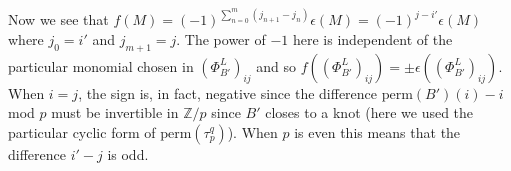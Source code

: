 \documentclass[11pt]{amsart}
\def\Z{{\mathbb Z}}
\begin{document}
  Now we see that $f(M) = (-1)^{\sum_{n=0}^m(j_{n+1}-j_n)}\epsilon(M) = (-1)^{j-i'}\epsilon(M)$ where $j_0=i'$ and $j_{m+1}=j$. The power of $-1$ here is independent of the particular monomial chosen in $\left(\Phi_{B'}^L\right)_{ij}$ and so $f((\Phi_{B'}^L)_{ij}) = \pm\epsilon((\Phi_{B'}^L)_{ij})$. When $i = j$, the sign is, in fact, negative since the difference $\text{perm}(B')(i)-i$ mod $p$ must be invertible in $\Z\big/p$ since $B'$ closes to a knot (here we used the particular cyclic form of $\text{perm}(\tau_p^q)$). When $p$ is even this means that the difference $i' - j$ is odd. 
\end{document}
